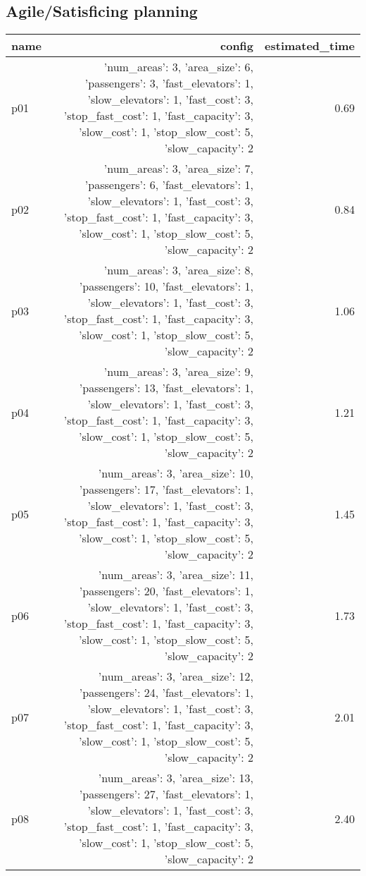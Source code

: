 \documentclass{article}
\begin{document}
                                \subsection*{Agile/Satisficing planning}
                                
                            \begin{center}
                            \scriptsize
                            \begin{tabular}{@{}l|r|r@{}}
                            name & config & estimated\_time\\\midrule
                              p01&{'num\_areas': 3, 'area\_size': 6, 'passengers': 3, 'fast\_elevators': 1, 'slow\_elevators': 1, 'fast\_cost': 3, 'stop\_fast\_cost': 1, 'fast\_capacity': 3, 'slow\_cost': 1, 'stop\_slow\_cost': 5, 'slow\_capacity': 2}&0.69\\
  p02&{'num\_areas': 3, 'area\_size': 7, 'passengers': 6, 'fast\_elevators': 1, 'slow\_elevators': 1, 'fast\_cost': 3, 'stop\_fast\_cost': 1, 'fast\_capacity': 3, 'slow\_cost': 1, 'stop\_slow\_cost': 5, 'slow\_capacity': 2}&0.84\\
  p03&{'num\_areas': 3, 'area\_size': 8, 'passengers': 10, 'fast\_elevators': 1, 'slow\_elevators': 1, 'fast\_cost': 3, 'stop\_fast\_cost': 1, 'fast\_capacity': 3, 'slow\_cost': 1, 'stop\_slow\_cost': 5, 'slow\_capacity': 2}&1.06\\
  p04&{'num\_areas': 3, 'area\_size': 9, 'passengers': 13, 'fast\_elevators': 1, 'slow\_elevators': 1, 'fast\_cost': 3, 'stop\_fast\_cost': 1, 'fast\_capacity': 3, 'slow\_cost': 1, 'stop\_slow\_cost': 5, 'slow\_capacity': 2}&1.21\\
  p05&{'num\_areas': 3, 'area\_size': 10, 'passengers': 17, 'fast\_elevators': 1, 'slow\_elevators': 1, 'fast\_cost': 3, 'stop\_fast\_cost': 1, 'fast\_capacity': 3, 'slow\_cost': 1, 'stop\_slow\_cost': 5, 'slow\_capacity': 2}&1.45\\
  p06&{'num\_areas': 3, 'area\_size': 11, 'passengers': 20, 'fast\_elevators': 1, 'slow\_elevators': 1, 'fast\_cost': 3, 'stop\_fast\_cost': 1, 'fast\_capacity': 3, 'slow\_cost': 1, 'stop\_slow\_cost': 5, 'slow\_capacity': 2}&1.73\\
  p07&{'num\_areas': 3, 'area\_size': 12, 'passengers': 24, 'fast\_elevators': 1, 'slow\_elevators': 1, 'fast\_cost': 3, 'stop\_fast\_cost': 1, 'fast\_capacity': 3, 'slow\_cost': 1, 'stop\_slow\_cost': 5, 'slow\_capacity': 2}&2.01\\
  p08&{'num\_areas': 3, 'area\_size': 13, 'passengers': 27, 'fast\_elevators': 1, 'slow\_elevators': 1, 'fast\_cost': 3, 'stop\_fast\_cost': 1, 'fast\_capacity': 3, 'slow\_cost': 1, 'stop\_slow\_cost': 5, 'slow\_capacity': 2}&2.40\\

\end{tabular}
\end{center}
\end{document}
